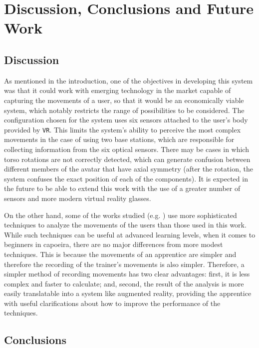 \chapter{Discussion, Conclusions and Future Work}

\section{Discussion}

As mentioned in the introduction, one of the objectives in developing this system was that it could work with emerging technology in the market capable of capturing the movements of a user, so that it would be an economically viable system, which notably restricts the range of possibilities to be considered. The configuration chosen for the system uses six sensors attached to the user's body provided by \texttt{VR}. This limits the system's ability to perceive the most complex movements in the case of using two base stations, which are responsible for collecting information from the six optical sensors. There may be cases in which torso rotations are not correctly detected, which can generate confusion between different members of the avatar that have axial symmetry (after the rotation, the system confuses the exact position of each of the components). It is expected in the future to be able to extend this work with the use of a greater number of sensors and more modern virtual reality glasses.

On the other hand, some of the works studied (e.g. \cite{Keerthy:Thesis:2012,Kyan:2015:ABD:2753829.2735951}) use more sophisticated techniques to analyze the movements of the users than those used in this work. While such techniques can be useful at advanced learning levels, when it comes to beginners in capoeira, there are no major differences from more modest techniques. This is because the movements of an apprentice are simpler and therefore the recording of the trainer's movements is also simpler. Therefore, a simpler method of recording movements has two clear advantages: first, it is less complex and faster to calculate; and, second, the result of the analysis is more easily translatable into a system like augmented reality, providing the apprentice with useful clarifications about how to improve the performance of the techniques.

\section{Conclusions}

